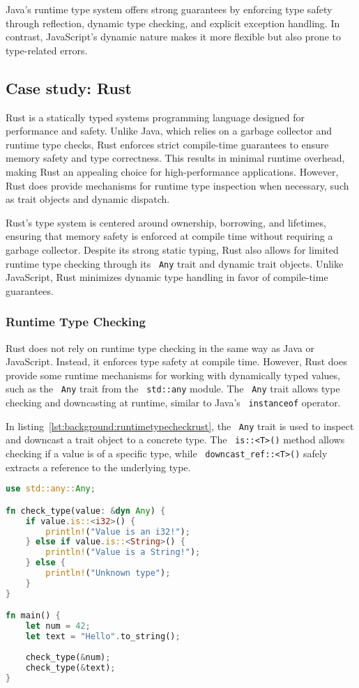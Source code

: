 Java’s runtime type system offers strong guarantees by enforcing type safety through reflection, dynamic type checking, and explicit exception handling. In contrast, JavaScript’s dynamic nature makes it more flexible but also prone to type-related errors.

\subsection{Case study: Rust}

Rust is a statically typed systems programming language designed for performance and safety. Unlike Java, which relies on a garbage collector and runtime type checks, Rust enforces strict compile-time guarantees to ensure memory safety and type correctness. This results in minimal runtime overhead, making Rust an appealing choice for high-performance applications. However, Rust does provide mechanisms for runtime type inspection when necessary, such as trait objects and dynamic dispatch.

Rust’s type system is centered around ownership, borrowing, and lifetimes, ensuring that memory safety is enforced at compile time without requiring a garbage collector. Despite its strong static typing, Rust also allows for limited runtime type checking through its ~\lstinline|Any| trait and dynamic trait objects. Unlike JavaScript, Rust minimizes dynamic type handling in favor of compile-time guarantees.

\subsubsection{Runtime Type Checking}
Rust does not rely on runtime type checking in the same way as Java or JavaScript. Instead, it enforces type safety at compile time. However, Rust does provide some runtime mechanisms for working with dynamically typed values, such as the ~\lstinline|Any| trait from the ~\lstinline|std::any| module. The ~\lstinline|Any| trait allows type checking and downcasting at runtime, similar to Java's ~\lstinline|instanceof| operator.

In listing~\ref{lst:background:runtimetypecheckrust}, the ~\lstinline|Any| trait is used to inspect and downcast a trait object to a concrete type. The ~\lstinline|is::<T>()| method allows checking if a value is of a specific type, while ~\lstinline|downcast_ref::<T>()| safely extracts a reference to the underlying type.

\begin{lstlisting}[language=Rust,caption=Runtime type checking in Rust,label=lst:background:runtimetypecheckrust]
use std::any::Any;

fn check_type(value: &dyn Any) {
	if value.is::<i32>() {
		println!("Value is an i32!");
	} else if value.is::<String>() {
		println!("Value is a String!");
	} else {
		println!("Unknown type");
	}
}

fn main() {
	let num = 42;
	let text = "Hello".to_string();
	
	check_type(&num);
	check_type(&text);
}
\end{lstlisting}

